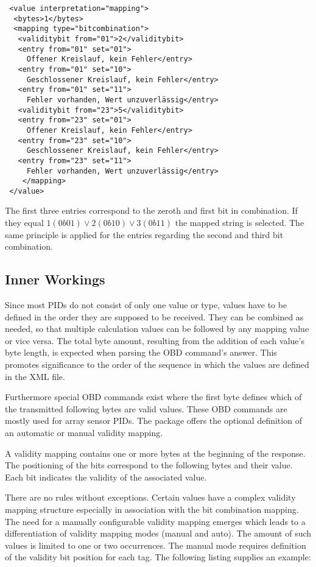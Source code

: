 \begin{verbatim}
 <value interpretation="mapping">
  <bytes>1</bytes>
  <mapping type="bitcombination">
   <validitybit from="01">2</validitybit>
   <entry from="01" set="01">
     Offener Kreislauf, kein Fehler</entry>
   <entry from="01" set="10">
     Geschlossener Kreislauf, kein Fehler</entry>
   <entry from="01" set="11">
     Fehler vorhanden, Wert unzuverlässig</entry>
   <validitybit from="23">5</validitybit>
   <entry from="23" set="01">
     Offener Kreislauf, kein Fehler</entry>
   <entry from="23" set="10">
     Geschlossener Kreislauf, kein Fehler</entry>
   <entry from="23" set="11">
     Fehler vorhanden, Wert unzuverlässig</entry>
    </mapping>    
 </value>
\end{verbatim}

The first three entries correspond to the zeroth and first bit in combination. If they equal $1(0b01) \vee 2(0b10) \vee 3(0b11)$ the mapped string is selected.
The same principle is applied for the entries regarding the second and third bit combination.

\subsection{Inner Workings}

Since most PIDs do not consist of only one value or type, values have to be defined in the order they are supposed to be received. They can be 
combined as needed, so that multiple calculation values can be followed by any mapping value or vice versa. The total byte amount, resulting from the
addition of each value's byte length, is expected when parsing the OBD command's answer. This promotes significance to the order of the sequence in which the 
values are defined in the XML file.

Furthermore special OBD commands exist where the first byte defines which of the transmitted following bytes are valid values. These OBD 
commands are mostly used for array sensor PIDs. The package offers the optional definition of an automatic or manual validity mapping.

A validity mapping contains one or more bytes at the beginning of the response. The positioning of the bits correspond to the following bytes and 
their value. Each bit indicates the validity of the associated value.

There are no rules without exceptions. Certain values have a complex validity mapping structure especially in association with the bit 
combination mapping. The need for a manually configurable validity mapping emerges which leads to a differentiation of validity mapping 
modes (manual and auto). The amount of such values is limited to one or two occurrences. The manual mode requires definition of the validity bit position
for each tag. The following listing supplies an example:

